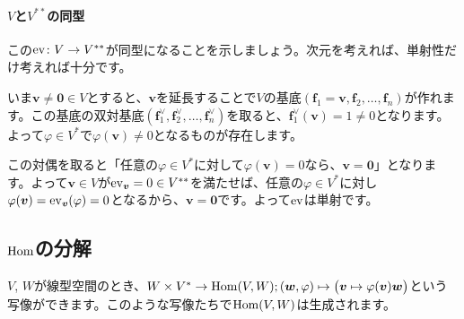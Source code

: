 \paragraph{$V$と$V^{**}$の同型} この$\operatorname{ev}\colon V\rightarrow V^{**}$が同型になることを示しましょう。次元を考えれば、単射性だけ考えれば十分です。

いま$\bm{v} \neq \bm{0} \in V$とすると、$\bm{v}$を延長することで$V$の基底$(\bm{f}_1 = \bm{v}, \bm{f}_2, \ldots, \bm{f}_n)$が作れます。この基底の双対基底$(\bm{f}^{\vee}_1, \bm{f}^{\vee}_2, \ldots, \bm{f}^{\vee}_n)$を取ると、$\bm{f}^{\vee}_1(\bm{v}) = 1 \neq 0$となります。よって$\varphi \in V^*$で$\varphi(\bm{v})\neq 0$となるものが存在します。

この対偶を取ると「任意の$\varphi \in V^*$に対して$\varphi(\bm{v}) = 0$なら、$\bm{v} = \bm{0}$」となります。よって$\bm{v} \in V$が$\operatorname{ev}_{\boldsymbol{v}} = 0 \in V^{**}$を満たせば、任意の$\varphi \in V^*$に対し$\varphi(\boldsymbol{v}) = \operatorname{ev}_{\boldsymbol{v}}(\varphi) = 0$となるから、$\bm{v} = \bm{0}$です。よって$\operatorname{ev}$は単射です。

\subsection{$\operatorname{Hom}$の分解}

$V$, $W$が線型空間のとき、$W\times V^* \rightarrow \operatorname{Hom}(V, W); (\boldsymbol{w}, \varphi)\mapsto\bigl(\boldsymbol{v}\mapsto \varphi(\boldsymbol{v})\boldsymbol{w}\bigr)$という写像ができます。このような写像たちで$\operatorname{Hom}(V, W)$は生成されます。

